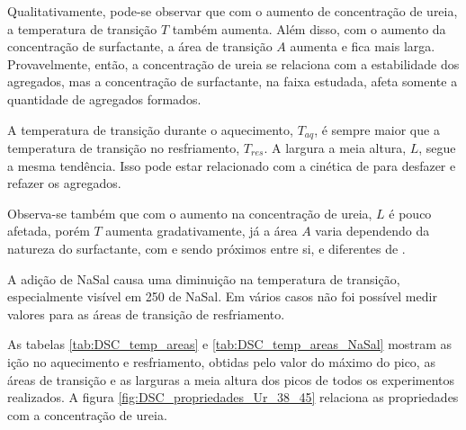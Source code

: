 	Qualitativamente, pode-se observar que com o aumento de concentração de ureia, a temperatura de transição \(T\) também aumenta. Além disso, com o aumento da concentração de surfactante, a área de transição \(A\) aumenta e fica mais larga. Provavelmente, então, a concentração de ureia se relaciona com a estabilidade dos agregados, mas a concentração de surfactante, na faixa estudada, afeta somente a quantidade de agregados formados. 
	
	A temperatura de transição durante o aquecimento, \(T_{aq}\), é sempre maior que a temperatura de transição no resfriamento, \(T_{res}\). A largura a meia altura, \(L\), segue a mesma tendência. Isso pode estar relacionado com a cinética de para desfazer e refazer os agregados. 
	
	Observa-se também que com o aumento na concentração de ureia, \(L\) é pouco afetada, porém \(T\) aumenta gradativamente, já a área \(A\) varia dependendo da natureza do surfactante, com \CTAB{} e \TTAB{} sendo próximos entre si, e diferentes de \DTAB.
	
	A adição de NaSal causa uma diminuição na temperatura de transição, especialmente visível em 250\mM{} de NaSal. Em vários casos não foi possível medir valores para as áreas de transição de resfriamento.
	
	As tabelas \ref{tab:DSC_temp_areas} e \ref{tab:DSC_temp_areas_NaSal} mostram as ição no aquecimento e resfriamento, obtidas pelo valor do máximo do pico, as áreas de transição e as larguras a meia altura dos picos de todos os experimentos realizados. A figura \ref{fig:DSC_propriedades_Ur_38_45} relaciona as propriedades com a concentração de ureia. %
	
